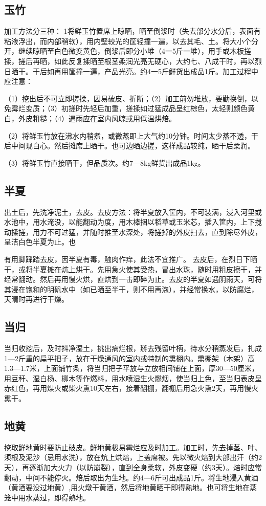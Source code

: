 \documentclass{ctexbook}
\begin{document}
\subsection{玉竹}
加工方法分三种：
1将鲜玉竹置席上晾晒，晒至倒浆时（失去部分水分后，表面有粘液浮出，而内部稍软），用内壁较光的筐轻撞一遍，以去其毛、土。将大小个分开，继续晾晒至白色微变黄色，倒浆后即分小堆（4一5斤一堆），用手或木板搓揉，搓后再晒，如此反复揉晒至根茎柔润光亮无硬心，大约七、八成干时，再以烈日晒干。干后如再用筐撞一遍，产品光亮。约4一5斤鲜货出成品1斤。加工过程中应注意：

（1）挖出后不可立即搓揉，因易破皮、折断；（2）加工前勿堆放，要勤换倒，以免霉烂变质；（3）初搓时先轻后加重，搓揉如过猛成品呈红棕色，太轻则颜色黄白，外皮粗糙；（4）遇雨应在室内风晾或用低温烘焙。

（2）将鲜玉竹放在沸水内稍煮，或微蒸即上大气约10分钟。时间太少蒸不透，干后中间现白心。然后摊席上晒干。也可边晒边搓，这样成品较纯，晒干后柔润。

（3）将鲜玉竹直接晒干，但品质次。约7—8kg鲜货出成品1kg。

\subsection{半夏}
出土后，先洗净泥土，去皮。去皮方法：将半夏放入筐内，不可装满，浸入河里或水池中，用水淹没，以能翻动为度，用木棒捆以稻草或玉米芯，插入筐内，上下搅动揉搓，用力不可过猛，并随时推至水深处，将搓掉的外皮扫去，直到除尽外皮，呈洁白色半夏为止。也

有用脚踩踏去皮，因半夏有毒，触肉作痒，此法不宜推广。
去皮后，在烈日下晒干，或将半夏摊在炕上烘干。先用急火使其受热，冒出水珠，随时用粗皮擦干，并经常翻动。然后再用慢火烘，直烘到一击即碎为止。去皮的半夏如遇阴雨天，可将其浸在饱和的明矾水中（如已晒至半干，则不用再泡），并经常换水，以防腐烂，天晴时再进行干燥。
\subsection{当归}
当归收挖后，及时抖净湿土，挑出病烂根，掰去残留叶柄，待水分稍蒸发后，扎成1—2斤重的扁平把子，放在干燥通风的室内或特制的熏棚内。熏棚架（木架）高1.3—1.7米，上面铺竹条，将当归把子平放与立放相间铺在上面，厚30—50厘米，用豆秆、湿白杨、柳木等作燃料，用水喷湿生火燃烟，使当归上色，至当归表皮呈赤红色，再用煤火或柴火熏10天左右，接着翻棚，翻棚后用急火熏2天，再用慢火熏干。
\subsection{地黄}
挖取鲜地黄时要防止破皮。鲜地黄极易霉烂应及时加工。加工时，先去掉茎、叶、须根及泥沙（忌用水洗），放在炕上烘焙，上盖席被。先以微火焙到大部出汗（约2天），再逐渐加大火力（以防崩裂），直到全身柔软，外皮变硬（约3天）。焙时应常翻动，中间不能停火。焙后取出为生地。约4—6斤可出成品1斤。将生地浸入黄酒（黄酒要没过地黄）,用火燉干黄酒，然后将地黄晒干即得熟地。也可将生地在蒸笼中用水蒸过，即得熟地。
\end{document}
